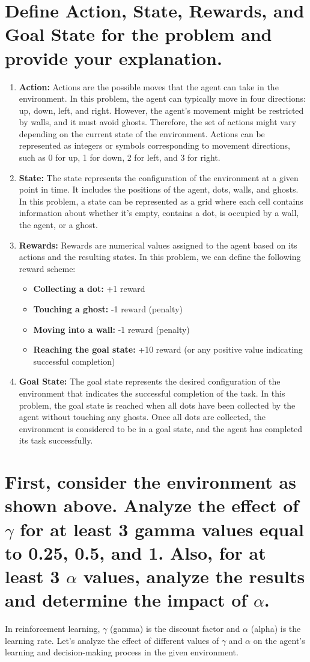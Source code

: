 \documentclass[12pt,onecolumn,a4paper]{article}
\begin{document}
\section{Define Action, State, Rewards, and Goal State for the problem and provide your explanation.}
\begin{enumerate}
	\item{\textbf{Action:}} Actions are the possible moves that the agent can take in the environment. In this problem, the agent can typically move in four directions: up, down, left, and right. However, the agent's movement might be restricted by walls, and it must avoid ghosts. Therefore, the set of actions might vary depending on the current state of the environment. Actions can be represented as integers or symbols corresponding to movement directions, such as 0 for up, 1 for down, 2 for left, and 3 for right.
	\item{\textbf{State:}} The state represents the configuration of the environment at a given point in time. It includes the positions of the agent, dots, walls, and ghosts. In this problem, a state can be represented as a grid where each cell contains information about whether it's empty, contains a dot, is occupied by a wall, the agent, or a ghost.
	\item{\textbf{Rewards:}} Rewards are numerical values assigned to the agent based on its actions and the resulting states. In this problem, we can define the following reward scheme:
	\begin{itemize}
		\item{\textbf{Collecting a dot:}} +1 reward
		\item{\textbf{Touching a ghost:}} -1 reward (penalty)
		\item{\textbf{Moving into a wall:}} -1 reward (penalty)
		\item{\textbf{Reaching the goal state:}} +10 reward (or any positive value indicating successful completion)
	\end{itemize}
	\item{\textbf{Goal State:}} The goal state represents the desired configuration of the environment that indicates the successful completion of the task. In this problem, the goal state is reached when all dots have been collected by the agent without touching any ghosts. Once all dots are collected, the environment is considered to be in a goal state, and the agent has completed its task successfully.
\end{enumerate}

\section{First, consider the environment as shown above. Analyze the effect of $\gamma$ for at least 3 gamma values equal to 0.25, 0.5, and 1. Also, for at least 3 $\alpha$ values, analyze the results and determine the impact of $\alpha$.}
In reinforcement learning, $\gamma$ (gamma) is the discount factor and $\alpha$ (alpha) is the learning rate. Let's analyze the effect of different values of $\gamma$ and $\alpha$ on the agent's learning and decision-making process in the given environment.\\
\end{document}
